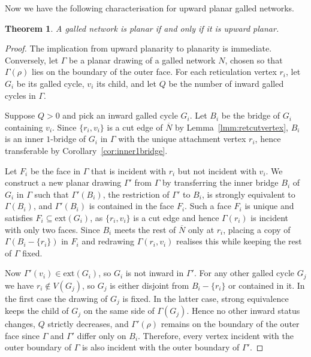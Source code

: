 \documentclass[pdflatex,sn-mathphys-num]{sn-jnl}
\theoremstyle{thmstyleone}%
\newtheorem{theorem}{Theorem}%
\theoremstyle{thmstyletwo}%
\theoremstyle{thmstylethree}%
\begin{document}
Now we have the following characterisation for upward planar galled networks.

\begin{theorem}
\label{upward:thm}
A galled network is planar if and only if it is upward planar.
\end{theorem}


\begin{proof}
The implication from upward planarity to planarity is immediate. Conversely, let $\Gamma$ be a planar drawing of a galled network $N$, chosen so that $\Gamma(\rho)$ lies on the boundary of the outer face. For each reticulation vertex $r_i$, let $G_i$ be its galled cycle, $v_i$ its child, and let $Q$ be the number of inward galled cycles in $\Gamma$.

Suppose $Q>0$ and pick an inward galled cycle $G_i$. Let $B_i$ be the bridge of $G_i$ containing $v_i$. Since $\{r_i,v_i\}$ is a cut edge of $\overline N$ by Lemma~\ref{lmm:retcutvertex}, $B_i$ is an inner $1$-bridge of $G_i$ in $\Gamma$ with the unique attachment vertex $r_i$, hence transferable by Corollary~\ref{cor:inner1bridge}.

Let $F_i$ be the face in $\Gamma$ that is incident with $r_i$ but not incident with $v_i$. We construct a new planar drawing $\Gamma'$ from $\Gamma$ by transferring the inner bridge $B_i$ of $G_i$ in  $\Gamma$ such that $\Gamma'(B_i)$, the restriction of $\Gamma'$ to $B_i$, is strongly equivalent to $\Gamma(B_i)$, and $\Gamma'(B_i)$ is contained in the face $F_i$. Such a face $F_i$ is unique and satisfies $F_i\subseteq\mathrm{ext}(G_i)$, as $\{r_i,v_i\}$ is a cut edge and hence $\Gamma(r_i)$ is incident with only two faces. Since $B_i$ meets the rest of $\overline N$ only at $r_i$, placing a copy of $\Gamma(B_i-\{r_i\})$ in $F_i$ and redrawing $\Gamma(r_i,v_i)$ realises this while keeping the rest of $\Gamma$ fixed.

Now $\Gamma'(v_i)\in\mathrm{ext}(G_i)$, so $G_i$ is not inward in $\Gamma'$. For any other galled cycle $G_j$ we have $r_i\notin V(G_j)$, so $G_j$ is either disjoint from $B_i-\{r_i\}$ or contained in it. In the first case the drawing of $G_j$ is fixed. In the latter case, strong equivalence keeps the child of $G_j$ on the same side of $\Gamma(G_j)$. Hence no other inward status changes, $Q$ strictly decreases, and $\Gamma'(\rho)$ remains on the boundary of the outer face since $\Gamma$ and $\Gamma'$ differ only on $B_i$. Therefore, every vertex incident with the outer boundary of $\Gamma$ is also incident with the outer boundary of $\Gamma'$. 



\end{proof}
\end{document}
